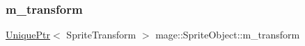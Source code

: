 \hypertarget{classmage_1_1_sprite_object_a9523ae6f081a8fde3cbb3558f6e327da}{}\label{classmage_1_1_sprite_object_a9523ae6f081a8fde3cbb3558f6e327da} 
\subsubsection{\texorpdfstring{m\+\_\+transform}{m\_transform}}
{\footnotesize\ttfamily \hyperlink{namespacemage_a8c307fbcc33bce9b7f2aa4c26c3b95cf}{Unique\+Ptr}$<$ Sprite\+Transform $>$ mage\+::\+Sprite\+Object\+::m\+\_\+transform\hspace{0.3cm}{\ttfamily [private]}}


